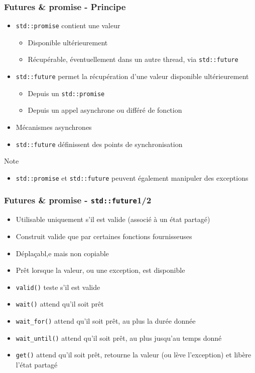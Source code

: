 \documentclass[C++.tex]{subfiles}
\begin{document}
\begin{frame}[fragile]
	\frametitle{Futures \& promise - Principe}
	\begin{itemize}
		\item \lstinline|std::promise| contient une valeur
		\begin{itemize}
			\item Disponible ultérieurement
			\item Récupérable, éventuellement dans un autre thread, via \lstinline|std::future|
		\end{itemize}
		\item \lstinline|std::future| permet la récupération d'une valeur disponible ultérieurement
		\begin{itemize}
			\item Depuis un \lstinline|std::promise|
			\item Depuis un appel asynchrone ou différé de \og fonction\fg{}
		\end{itemize}
		\item Mécanismes asynchrones
		\item \lstinline|std::future| définissent des points de synchronisation
	\end{itemize}

	\begin{block}{Note}
		\begin{itemize}
			\item \lstinline|std::promise| et \lstinline|std::future| peuvent également manipuler des exceptions
		\end{itemize}
	\end{block}
\end{frame}

\begin{frame}[fragile]
	\frametitle{Futures \& promise - \lstinline|std::future|\titlehfill{}1/2}
	\begin{itemize}
		\item Utilisable uniquement s'il est valide (associé à un état partagé)
		\item Construit valide que par certaines fonctions \og fournisseuses\fg{}
		\item Déplaçabl,e mais non copiable
		\item Prêt lorsque la valeur, ou une exception, est disponible
		\item \lstinline|valid()| teste s'il est valide
		\item \lstinline|wait()| attend qu'il soit prêt
		\item \lstinline|wait_for()| attend qu'il soit prêt, au plus la durée donnée
		\item \lstinline|wait_until()| attend qu'il soit prêt, au plus jusqu'au temps donné
		\item \lstinline|get()| attend qu'il soit prêt, retourne la valeur (ou lève l'exception) et libère l'état partagé
	\end{itemize}
\end{frame}
\end{document}
